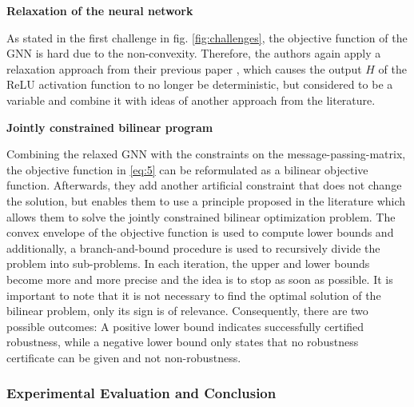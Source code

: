 \documentclass[a4paper,preprint]{sig-alternate}
\begin{document}
\textbf{Relaxation of the neural network}\newline

As stated in the first challenge in fig. \ref{fig:challenges}, the objective function of the GNN is hard due to the non-convexity.
Therefore, the authors again apply a relaxation approach from their previous paper \cite{Zuegner_2019}, which causes the output $H$ 
of the ReLU activation function to no longer be deterministic, but considered to be a variable and combine it with ideas
of another approach from the literature.\newline

\textbf{Jointly constrained bilinear program}\newline

Combining the relaxed GNN with the constraints on the message-passing-matrix, the objective function in \ref{eq:5} 
can be reformulated as a bilinear objective function. \cite{10.1145/3394486.3403217}
Afterwards, they add another artificial constraint that does not change the solution, but enables them to use 
a principle proposed in the literature which allows them to solve the jointly constrained bilinear optimization problem.
The convex envelope of the objective function is used to compute lower bounds and additionally, a branch-and-bound procedure is used
to recursively divide the problem into sub-problems. In each iteration, the upper and lower bounds become more and more precise
and the idea is to stop as soon as possible. It is important to note that it is not necessary to find the optimal solution of 
the bilinear problem, only its sign is of relevance. \cite{10.1145/3394486.3403217}
Consequently, there are two possible outcomes: A positive lower bound indicates successfully certified robustness, while a negative
lower bound only states that no robustness certificate can be given and not non-robustness. \cite{10.1145/3394486.3403217}\newline

\subsubsection{Experimental Evaluation and Conclusion}
\end{document}
